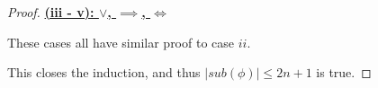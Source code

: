 \documentclass{article}
\begin{document}
\begin{proof}
  \noindent
  \textbf{\underline{(iii - v): $\lor$, $\implies$, $\iff$}} 
  \newline
  
  These cases all have similar proof to case $ii$.
  \newline

  \noindent
  This closes the induction, and thus $|sub(\phi)| \leq 2n + 1$ is true.

\end{proof}
\end{document}
